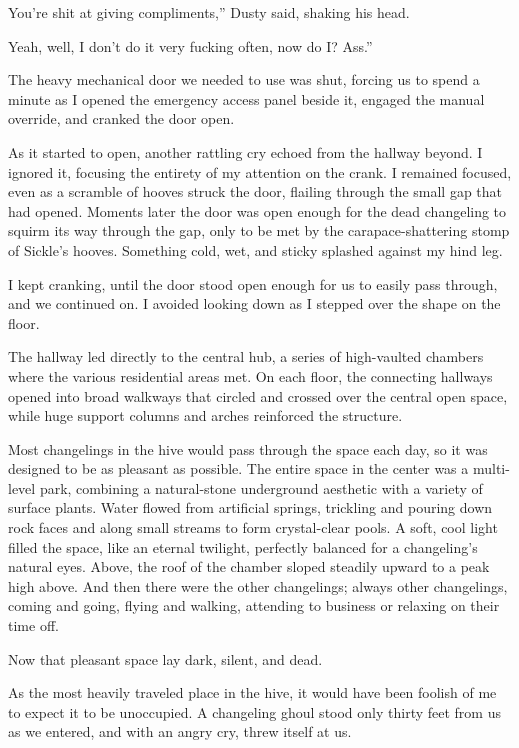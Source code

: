 \leavevmode{}You’re shit at giving compliments,” Dusty said, shaking his head.

\leavevmode{}Yeah, well, I don’t do it very fucking often, now do I? Ass.”

The heavy mechanical door we needed to use was shut, forcing us to spend a minute as I opened the emergency access panel beside it, engaged the manual override, and cranked the door open.

As it started to open, another rattling cry echoed from the hallway beyond. I ignored it, focusing the entirety of my attention on the crank. I remained focused, even as a scramble of hooves struck the door, flailing through the small gap that had opened. Moments later the door was open enough for the dead changeling to squirm its way through the gap, only to be met by the carapace-shattering stomp of Sickle’s hooves. Something cold, wet, and sticky splashed against my hind leg.

I kept cranking, until the door stood open enough for us to easily pass through, and we continued on. I avoided looking down as I stepped over the shape on the floor.

The hallway led directly to the central hub, a series of high-vaulted chambers where the various residential areas met. On each floor, the connecting hallways opened into broad walkways that circled and crossed over the central open space, while huge support columns and arches reinforced the structure.

Most changelings in the hive would pass through the space each day, so it was designed to be as pleasant as possible. The entire space in the center was a multi-level park, combining a natural-stone underground aesthetic with a variety of surface plants. Water flowed from artificial springs, trickling and pouring down rock faces and along small streams to form crystal-clear pools. A soft, cool light filled the space, like an eternal twilight, perfectly balanced for a changeling’s natural eyes. Above, the roof of the chamber sloped steadily upward to a peak high above. And then there were the other changelings; always other changelings, coming and going, flying and walking, attending to business or relaxing on their time off.

Now that pleasant space lay dark, silent, and dead.

As the most heavily traveled place in the hive, it would have been foolish of me to expect it to be unoccupied. A changeling ghoul stood only thirty feet from us as we entered, and with an angry cry, threw itself at us.

